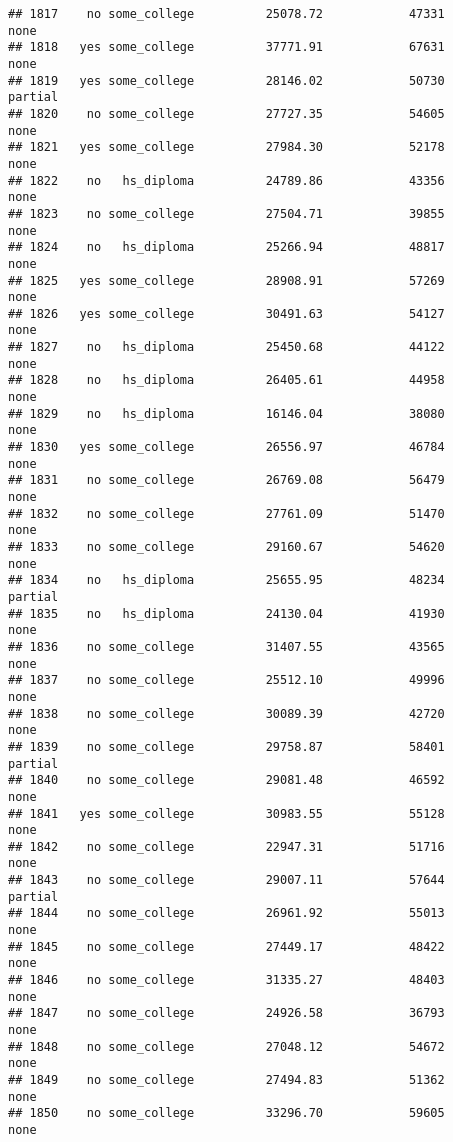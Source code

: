 \documentclass[
]{article}
\begin{document}
\begin{verbatim}
## 1817    no some_college          25078.72            47331        none
## 1818   yes some_college          37771.91            67631        none
## 1819   yes some_college          28146.02            50730     partial
## 1820    no some_college          27727.35            54605        none
## 1821   yes some_college          27984.30            52178        none
## 1822    no   hs_diploma          24789.86            43356        none
## 1823    no some_college          27504.71            39855        none
## 1824    no   hs_diploma          25266.94            48817        none
## 1825   yes some_college          28908.91            57269        none
## 1826   yes some_college          30491.63            54127        none
## 1827    no   hs_diploma          25450.68            44122        none
## 1828    no   hs_diploma          26405.61            44958        none
## 1829    no   hs_diploma          16146.04            38080        none
## 1830   yes some_college          26556.97            46784        none
## 1831    no some_college          26769.08            56479        none
## 1832    no some_college          27761.09            51470        none
## 1833    no some_college          29160.67            54620        none
## 1834    no   hs_diploma          25655.95            48234     partial
## 1835    no   hs_diploma          24130.04            41930        none
## 1836    no some_college          31407.55            43565        none
## 1837    no some_college          25512.10            49996        none
## 1838    no some_college          30089.39            42720        none
## 1839    no some_college          29758.87            58401     partial
## 1840    no some_college          29081.48            46592        none
## 1841   yes some_college          30983.55            55128        none
## 1842    no some_college          22947.31            51716        none
## 1843    no some_college          29007.11            57644     partial
## 1844    no some_college          26961.92            55013        none
## 1845    no some_college          27449.17            48422        none
## 1846    no some_college          31335.27            48403        none
## 1847    no some_college          24926.58            36793        none
## 1848    no some_college          27048.12            54672        none
## 1849    no some_college          27494.83            51362        none
## 1850    no some_college          33296.70            59605        none
\end{verbatim}
\end{document}
